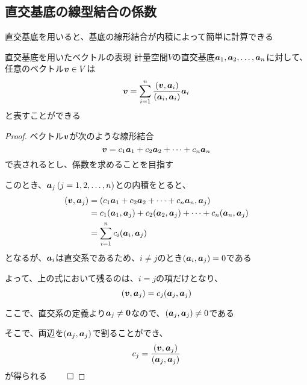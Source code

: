 \documentclass[../../../topic_linear-algebra]{subfiles}
\begin{document}
\subsection{直交基底の線型結合の係数}

直交基底を用いると、基底の線形結合が内積によって簡単に計算できる

\begin{theorem}{直交基底を用いたベクトルの表現}\label{thm:vector-expansion-by-orthogonal-basis}
  計量空間$V$の直交基底$\vb*{a}_1, \vb*{a}_2, \ldots, \vb*{a}_n$に対して、任意のベクトル$\vb*{v} \in V$は
  \begin{equation*}
    \vb*{v} = \sum_{i=1}^n \frac{(\vb*{v}, \vb*{a}_i)}{(\vb*{a}_i, \vb*{a}_i)} \vb*{a}_i
  \end{equation*}
  と表すことができる
\end{theorem}

\begin{proof}
  ベクトル$\vb*{v}$が次のような線形結合
  \begin{equation*}
    \vb*{v} = c_1 \vb*{a}_1 + c_2 \vb*{a}_2 + \cdots + c_n \vb*{a}_n
  \end{equation*}
  で表されるとし、係数を求めることを目指す

  このとき、$\vb*{a}_j\, (j=1,2,\ldots,n)$との内積をとると、
  \begin{align*}
    (\vb*{v}, \vb*{a}_j) & = (c_1 \vb*{a}_1 + c_2 \vb*{a}_2 + \cdots + c_n \vb*{a}_n, \vb*{a}_j)                           \\
                         & = c_1 (\vb*{a}_1, \vb*{a}_j) + c_2 (\vb*{a}_2, \vb*{a}_j) + \cdots + c_n (\vb*{a}_n, \vb*{a}_j) \\
                         & = \sum_{i=1}^n c_i (\vb*{a}_i, \vb*{a}_j)
  \end{align*}
  となるが、$\vb*{a}_i$は直交系であるため、$i \neq j$のとき$(\vb*{a}_i, \vb*{a}_j) = 0$である

  よって、上の式において残るのは、$i=j$の項だけとなり、
  \begin{equation*}
    (\vb*{v}, \vb*{a}_j) = c_j (\vb*{a}_j, \vb*{a}_j)
  \end{equation*}

  ここで、直交系の定義より$\vb*{a}_j \neq \vb*{0}$なので、$(\vb*{a}_j, \vb*{a}_j) \neq 0$である

  そこで、両辺を$(\vb*{a}_j, \vb*{a}_j)$で割ることができ、
  \begin{equation*}
    c_j = \frac{(\vb*{v}, \vb*{a}_j)}{(\vb*{a}_j, \vb*{a}_j)}
  \end{equation*}
  が得られる $\qed$
\end{proof}
\end{document}
